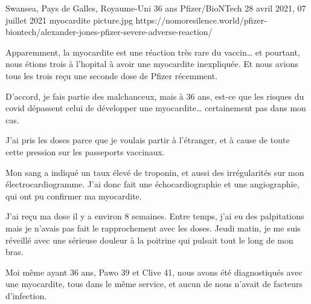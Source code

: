           {Swansea, Pays de Galles, Royaume-Uni}
          {36 ans}
          {Pfizer/BioNTech}
          {28 avril 2021, 07 juillet 2021}
          {myocardite}
          {picture.jpg}
          {https://nomoresilence.world/pfizer-biontech/alexander-jones-pfizer-severe-adverse-reaction/}
          {

Apparemment, la myocardite est une réaction très rare du vaccin… et pourtant,
nous étions trois à l'hopital à avoir une myocardite inexpliquée. Et nous avions
tous les trois reçu une seconde dose de Pfizer récemment.

D'accord, je fais partie des malchanceux, mais à 36 ans, est-ce que les risques
du covid dépassent celui de développer une myocardite… certainement pas dans mon
cas.

J'ai pris les doses parce que je voulais partir à l'étranger, et à cause de
toute cette pression sur les passeports vaccinaux.

Mon sang a indiqué un taux élevé de troponin, et aussi des irrégularités sur mon
électrocardiogramme. J'ai donc fait une échocardiographie et une angiographie,
qui ont pu confirmer ma myocardite.

J'ai reçu ma dose il y a environ 8 semaines. Entre temps, j'ai eu des
palpitations mais je n'avais pas fait le rapprochement avec les doses. Jeudi
matin, je me suis réveillé avec une sérieuse douleur à la poitrine qui pulsait
tout le long de mon bras.

Moi même ayant 36 ans, Pawo 39 et Clive 41, nous avons été diagnostiqués avec
une myocardite, tous dans le même service, et aucun de nous n'avait de facteurs
d'infection.

}
